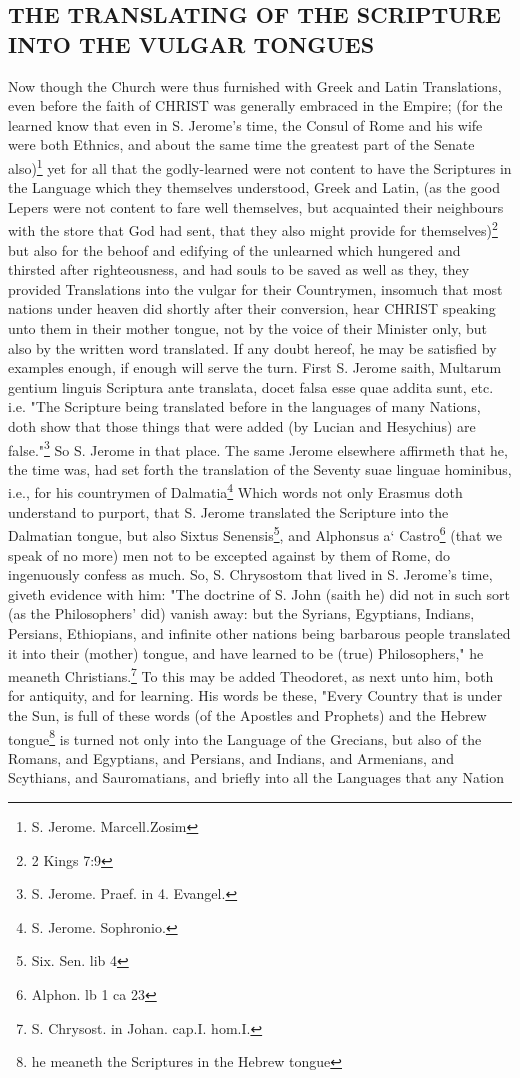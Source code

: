 \subsection{THE TRANSLATING OF THE SCRIPTURE INTO THE VULGAR TONGUES}

Now though the Church were thus furnished with Greek and Latin Translations, even before the faith of CHRIST was generally embraced in the Empire; (for the learned know that even in S. Jerome's time, the Consul of Rome and his wife were both Ethnics, and about the same time the greatest part of the Senate also)\footnote{S. Jerome. Marcell.Zosim} yet for all that the godly-learned were not content to have the Scriptures in the Language which they themselves understood, Greek and Latin, (as the good Lepers were not content to fare well themselves, but acquainted their neighbours with the store that God had sent, that they also might provide for themselves)\footnote{2 Kings 7:9} but also for the behoof and edifying of the unlearned which hungered and thirsted after righteousness, and had souls to be saved as well as they, they provided Translations into the vulgar for their Countrymen, insomuch that most nations under heaven did shortly after their conversion, hear CHRIST speaking unto them in their mother tongue, not by the voice of their Minister only, but also by the written word translated. If any doubt hereof, he may be satisfied by examples enough, if enough will serve the turn. First S. Jerome saith, Multarum gentium linguis Scriptura ante translata, docet falsa esse quae addita sunt, etc. i.e. "The Scripture being translated before in the languages of many Nations, doth show that those things that were added (by Lucian and Hesychius) are false."\footnote{S. Jerome. Praef. in 4. Evangel.} So S. Jerome in that place. The same Jerome elsewhere affirmeth that he, the time was, had set forth the translation of the Seventy suae linguae hominibus, i.e., for his countrymen of Dalmatia\footnote{S. Jerome. Sophronio.} Which words not only Erasmus doth understand to purport, that S. Jerome translated the Scripture into the Dalmatian tongue, but also Sixtus Senensis\footnote{Six. Sen. lib 4}, and Alphonsus a` Castro\footnote{Alphon. lb 1 ca 23} (that we speak of no more) men not to be excepted against by them of Rome, do ingenuously confess as much. So, S. Chrysostom that lived in S. Jerome's time, giveth evidence with him: "The doctrine of S. John (saith he) did not in such sort (as the Philosophers' did) vanish away: but the Syrians, Egyptians, Indians, Persians, Ethiopians, and infinite other nations being barbarous people translated it into their (mother) tongue, and have learned to be (true) Philosophers," he meaneth Christians.\footnote{S. Chrysost. in Johan. cap.I. hom.I.} To this may be added Theodoret, as next unto him, both for antiquity, and for learning. His words be these, "Every Country that is under the Sun, is full of these words (of the Apostles and Prophets) and the Hebrew tongue\footnote{he meaneth the Scriptures in the Hebrew tongue} is turned not only into the Language of the Grecians, but also of the Romans, and Egyptians, and Persians, and Indians, and Armenians, and Scythians, and Sauromatians, and briefly into all the Languages that any Nation 